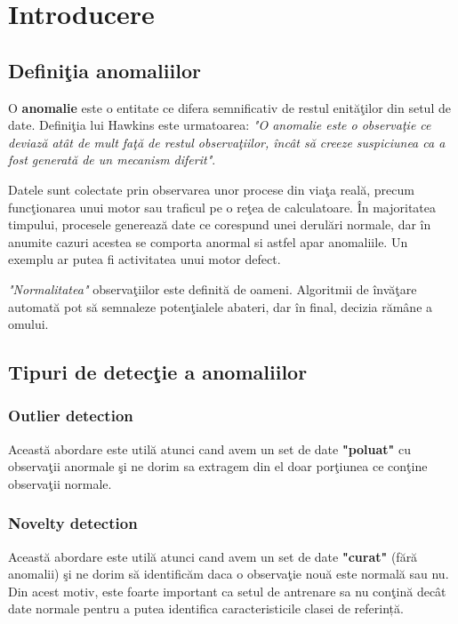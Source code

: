 \chapter{Introducere}

\section{Definiţia anomaliilor}

O \textbf{anomalie} este o entitate ce difera semnificativ de restul enităţilor din 
setul de date. Definiţia lui Hawkins este urmatoarea\cite{Identification of Outliers}:
\textit{"O anomalie este o observaţie ce deviază atât de mult faţă de restul observaţiilor,
încât să creeze suspiciunea ca a fost generată de un mecanism diferit"}.

Datele sunt colectate prin observarea unor procese din viaţa reală, precum funcţionarea
unui motor sau traficul pe o reţea de calculatoare. În majoritatea timpului, procesele
generează date ce corespund unei derulări normale, dar în anumite cazuri acestea se 
comporta anormal si astfel apar anomaliile. Un exemplu ar putea fi activitatea unui
motor defect.

\textit{"Normalitatea"} observaţiilor este definită
de oameni. Algoritmii de învăţare automată pot să semnaleze potenţialele
abateri, dar în final, decizia rămâne a omului.

\section{Tipuri de detecţie a anomaliilor}

\subsection{Outlier detection}

Această abordare este utilă atunci cand avem un set de date \textbf{"poluat"} cu 
observaţii anormale şi ne dorim sa extragem din el doar porţiunea ce conţine 
observaţii normale.

\subsection{Novelty detection}

Această abordare este utilă atunci cand avem un set de date \textbf{"curat"} (fără 
anomalii) şi ne dorim să identificăm daca o observaţie nouă este normală sau nu. 
Din acest motiv, este foarte important ca setul de antrenare sa nu conţină
decât date normale pentru a putea identifica caracteristicile clasei de referință.

